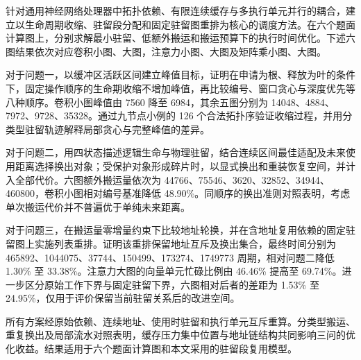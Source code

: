 针对通用神经网络处理器中拓扑依赖、有限连续缓存与多执行单元并行的耦合，建立以生命周期收缩、驻留段分配和固定驻留图重排为核心的调度方法。在六个题面计算图上，分别求解最小驻留、低额外搬运和搬运预算下的执行时间优化。下述六图结果依次对应卷积小图、大图，注意力小图、大图及矩阵乘小图、大图。

对于问题一，以缓冲区活跃区间建立峰值目标，证明在申请为根、释放为叶的条件下，固定操作顺序的生命期收缩不增加峰值，再比较编号、窗口贪心与深度优先等八种顺序。卷积小图峰值由 7560 降至 6984，其余五图分别为 14048、4884、7972、9728、35328。通过九节点小例的 126 个合法拓扑序验证收缩过程，并用分类型驻留轨迹解释局部贪心与完整峰值的差异。

对于问题二，用四状态描述逻辑生命与物理驻留，结合连续区间最佳适配及未来使用距离选择换出对象；受保护对象形成碎片时，以显式换出和重装恢复空间，并计入全部代价。六图额外搬运量依次为 44766、75546、3620、32852、34944、460800，卷积小图相对编号基准降低 48.90\%。同顺序的换出准则对照表明，考虑单次搬运代价并不普遍优于单纯未来距离。

对于问题三，在搬运量零增量约束下比较地址轮换，并在含地址复用依赖的固定驻留图上实施列表重排。证明该重排保留地址互斥及换出集合，最终时间分别为 465892、1044075、37744、150499、173274、1749773 周期，相对问题二降低 1.30\% 至 33.38\%。注意力大图的向量单元忙碌比例由 46.46\% 提高至 69.74\%。进一步区分原始工作下界与固定驻留下界，六图相对后者的差距为 1.53\% 至 24.95\%，仅用于评价保留当前驻留关系后的改进空间。

所有方案经原始依赖、连续地址、使用时驻留和执行单元互斥重算。分类型搬运、重复换出及局部流水对照表明，缓存压力集中位置与地址链结构共同影响三问的优化收益。结果适用于六个题面计算图和本文采用的驻留段复用模型。
